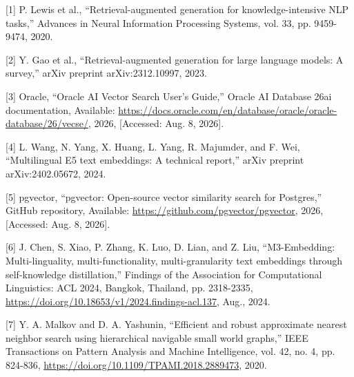 \documentclass[10pt,a4paper,twocolumn]{article}
\begin{document}
{\setlength{\parskip}{0pt}\fontsize{8}{9.2}\selectfont\raggedright

\noindent\hangindent=0.5cm
[1] P. Lewis et al., ``Retrieval-augmented generation for knowledge-intensive NLP tasks,'' Advances in Neural Information Processing Systems, vol. 33, pp. 9459-9474, 2020.
\par\vspace{0pt}

\noindent\hangindent=0.5cm
[2] Y. Gao et al., ``Retrieval-augmented generation for large language models: A survey,'' arXiv preprint arXiv:2312.10997, 2023.
\par\vspace{0pt}

\noindent\hangindent=0.5cm
[3] Oracle, ``Oracle AI Vector Search User's Guide,'' Oracle AI Database 26ai documentation, Available: \url{https://docs.oracle.com/en/database/oracle/oracle-database/26/vecse/}, 2026, [Accessed: Aug. 8, 2026].
\par\vspace{0pt}

\noindent\hangindent=0.5cm
[4] L. Wang, N. Yang, X. Huang, L. Yang, R. Majumder, and F. Wei, ``Multilingual E5 text embeddings: A technical report,'' arXiv preprint arXiv:2402.05672, 2024.
\par\vspace{0pt}

\noindent\hangindent=0.5cm
[5] pgvector, ``pgvector: Open-source vector similarity search for Postgres,'' GitHub repository, Available: \url{https://github.com/pgvector/pgvector}, 2026, [Accessed: Aug. 8, 2026].
\par\vspace{0pt}

\noindent\hangindent=0.5cm
[6] J. Chen, S. Xiao, P. Zhang, K. Luo, D. Lian, and Z. Liu, ``M3-Embedding: Multi-linguality, multi-functionality, multi-granularity text embeddings through self-knowledge distillation,'' Findings of the Association for Computational Linguistics: ACL 2024, Bangkok, Thailand, pp. 2318-2335, \url{https://doi.org/10.18653/v1/2024.findings-acl.137}, Aug., 2024.
\par\vspace{0pt}

\noindent\hangindent=0.5cm
[7] Y. A. Malkov and D. A. Yashunin, ``Efficient and robust approximate nearest neighbor search using hierarchical navigable small world graphs,'' IEEE Transactions on Pattern Analysis and Machine Intelligence, vol. 42, no. 4, pp. 824-836, \url{https://doi.org/10.1109/TPAMI.2018.2889473}, 2020.
\par\vspace{0pt}

}
\end{document}
